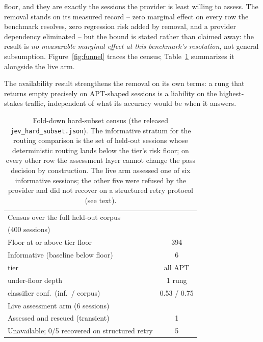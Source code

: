 floor, and they are exactly the sessions the provider is least willing
to assess. The removal stands on its measured record -- zero marginal
effect on every row the benchmark resolves, zero regression risk added
by removal, and a provider dependency eliminated -- but the bound is
stated rather than claimed away: the result is \emph{no measurable
marginal effect at this benchmark's resolution}, not general subsumption.
Figure~\ref{fig:funnel} traces the census; Table~\ref{tab:hardsunset}
summarizes it alongside the live arm.

The availability result strengthens the removal on its own terms: a
rung that returns empty precisely on APT-shaped sessions is a liability
on the highest-stakes traffic, independent of what its accuracy would
be when it answers.

\begin{table}[t]
\centering
\caption{Fold-down hard-subset census (the released
\texttt{jev\_hard\_subset.json}). The informative stratum for the routing
comparison is the set of held-out sessions whose deterministic routing
lands below the tier's risk floor; on every other row the assessment
layer cannot change the pass decision by construction. The live arm
assessed one of six informative sessions; the other five were refused
by the provider and did not recover on a structured retry protocol
(see text).}
\label{tab:hardsunset}
\small
\setlength{\tabcolsep}{4pt}
\begin{tabular}{@{}lc@{}}
\toprule
Census over the full held-out corpus & \\
(400 sessions) & \\
\midrule
Floor at or above tier floor & 394 \\
Informative (baseline below floor) & 6 \\
\quad tier & all APT \\
\quad under-floor depth & 1 rung \\
\quad classifier conf.\ (inf.\ / corpus) & 0.53 / 0.75 \\
\midrule
Live assessment arm (6 sessions) & \\
\midrule
Assessed and rescued (transient) & 1 \\
Unavailable; 0/5 recovered on structured retry & 5 \\
\bottomrule
\end{tabular}
\end{table}

